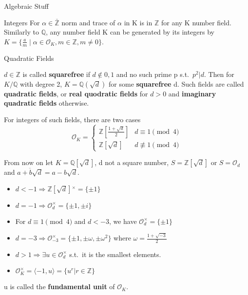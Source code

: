 \documentclass[12pt, letterpaper]{article}
\newcommand{\Q}{\mathbb{Q}}
\newcommand{\Z}{\mathbb{Z}}
\newcommand{\Ok}{\mathcal{O}}
\begin{document}
\begin{section}{Algebraic Stuff}
\begin{subsection}{Integers}
    For \(\alpha \in \bar{\Z}\) norm and trace of \(\alpha\) in K is
    in \(\Z\) for any K number field. \\
    Similarly to \(\Q\), any number field K can be generated by its
    integers by \(K = \{\frac{a}{m} \; | \; \alpha \in \Ok_{K}, m \in
    \Z, m \neq 0\}\).

  \end{subsection}

  \begin{subsection}{Quadratic Fields}

    \(d \in \Z\) is called \textbf{squarefree} if \(d \notin {0, 1}\)
    and no such prime p s.t.\ \(p^{2} | d\). Then for \(K / \Q\) with
    degree 2, \(K = \Q(\sqrt{d})\) for some \textbf{squarefree} d. Such
    fields are called \textbf{quadratic fields}, or \textbf{real quodratic
      fields} for \(d > 0\) and \textbf{imaginary quadratic fields} otherwise.

    For integers of such fields, there are two cases
    \[\Ok_{K} =
      \begin{cases}
        \Z[\frac{1 + \sqrt{d}}{2}] & d \equiv 1 \pmod{4} \\
        \Z[\sqrt{d}] & d \not\equiv 1 \pmod{4}
       \end{cases}
     \]

     From now on let \(K = \Q[\sqrt{d}]\), d not a square number,
     \(S = \Z[\sqrt{d}]\) or \(S = \Ok_{d}\) and
     \(\overline{a + b \sqrt{d}} = a - b \sqrt{d}\). \\
     \begin{itemize}
       \item \(d < -1 \Rightarrow \Z[\sqrt{d}]{}^{\times} =
             \{ \pm 1 \}\)
       \item \(d = -1 \Rightarrow \Ok_{d}^{\times} = \{ \pm 1, \pm
             i \}\)
       \item For \(d \equiv 1 \pmod{4}\) and \(d < -3\), we have
             \(\Ok_{d}^{\times} = \{ \pm 1 \}\)
       \item \(d = -3 \Rightarrow \Ok_{-3}^{\times} = \{ \pm 1, \pm
             \omega, \pm \omega^{2} \}\) where \(\omega = \frac{1 +
             \sqrt{-3}}{2}\)
       \item \(d > 1 \Rightarrow \exists u \in \Ok_{d}^{\times}\) s.t.\
             it is the smallest elements.
       \item \(\Ok_{K}^{\times} = \langle -1, u \rangle =
             \{ u^{r} | r \in \Z \}\)
     \end{itemize}
     u is called the \textbf{fundamental unit} of \(\Ok_{K}\).


\end{subsection}
\end{section}
\end{document}

